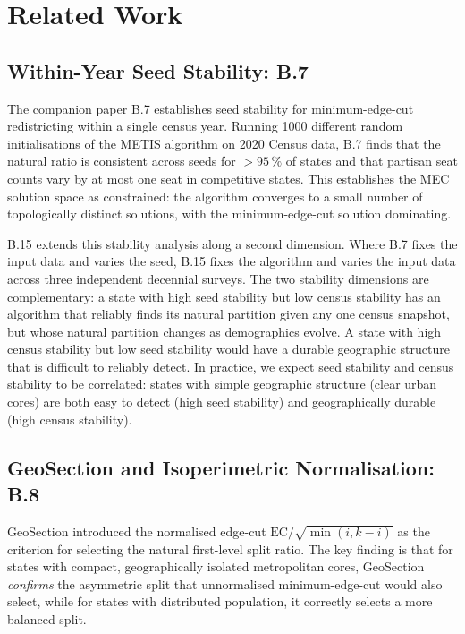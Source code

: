 \section{Related Work}
\label{sec:related}

\subsection{Within-Year Seed Stability: B.7}

The companion paper B.7 \citep{b7paper} establishes seed stability for
minimum-edge-cut redistricting within a single census year.
Running 1000 different random initialisations of the METIS algorithm on
2020 Census data, B.7 finds that the natural ratio is consistent across seeds
for $>95\,\%$ of states and that partisan seat counts vary by at most one seat
in competitive states.
This establishes the MEC solution space as constrained: the algorithm converges
to a small number of topologically distinct solutions, with the minimum-edge-cut
solution dominating.

B.15 extends this stability analysis along a second dimension.
Where B.7 fixes the input data and varies the seed, B.15 fixes the algorithm
and varies the input data across three independent decennial surveys.
The two stability dimensions are complementary: a state with high seed stability
but low census stability has an algorithm that reliably finds its natural
partition given any one census snapshot, but whose natural partition changes as
demographics evolve.
A state with high census stability but low seed stability would have a durable
geographic structure that is difficult to reliably detect.
In practice, we expect seed stability and census stability to be correlated:
states with simple geographic structure (clear urban cores) are both easy to
detect (high seed stability) and geographically durable (high census stability).

\subsection{GeoSection and Isoperimetric Normalisation: B.8}

GeoSection \citep{b8paper} introduced the normalised edge-cut
$\mathrm{EC}/\sqrt{\min(i,k-i)}$ as the criterion for selecting the natural
first-level split ratio.
The key finding is that for states with compact, geographically isolated
metropolitan cores, GeoSection \emph{confirms} the asymmetric split that
unnormalised minimum-edge-cut would also select, while for states with
distributed population, it correctly selects a more balanced split.

